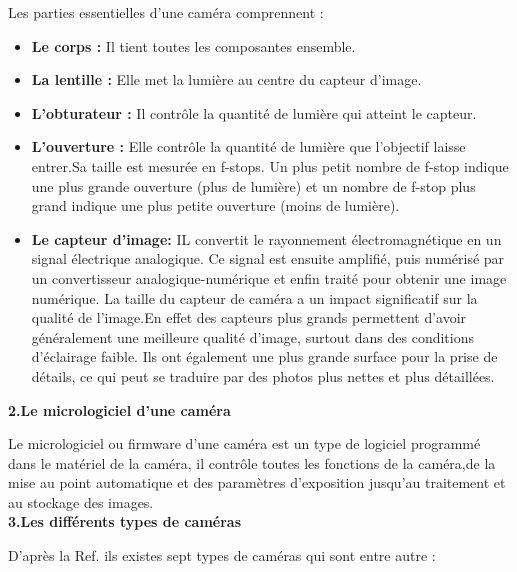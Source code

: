 \documentclass[12pt,a4paper]{report}
\begin{document}
Les parties essentielles d’une caméra comprennent : \\
\begin{itemize}
\item \textbf{Le corps :} Il tient toutes les composantes ensemble. \\
\item \textbf{La lentille :} Elle met la lumière au centre du capteur d’image. \\
\item \textbf{L’obturateur :} Il contrôle la quantité de lumière qui atteint le capteur.\\ 
\item \textbf{L’ouverture :} Elle contrôle la quantité de lumière que l’objectif laisse entrer.Sa taille est mesurée en f-stops. Un plus petit nombre de f-stop indique une plus grande ouverture (plus de lumière) et un nombre de f-stop plus grand indique une plus petite ouverture (moins de lumière).\\
\item \textbf{Le capteur d'image:} IL convertit le rayonnement électromagnétique en un signal électrique analogique. Ce signal est ensuite amplifié, puis numérisé par un convertisseur analogique-numérique et enfin traité pour obtenir une image numérique. La taille du capteur de caméra a un impact significatif sur la qualité de l’image.En effet des capteurs plus grands permettent d'avoir généralement une meilleure qualité d’image, surtout dans des conditions d’éclairage faible. Ils ont également une plus grande surface pour la prise de détails, ce qui peut se traduire par des photos plus nettes et plus détaillées.\\
\end{itemize}

\textbf{2.Le micrologiciel d'une caméra \\}

Le micrologiciel ou firmware d'une caméra est un type de logiciel programmé dans le matériel de la caméra, il contrôle toutes les fonctions de la caméra,de la mise au point automatique et des paramètres d’exposition jusqu’au traitement et au stockage des images.\\

\textbf{3.Les différents types de caméras \\}

D'après la Ref. \cite{noauthor_les_2015} ils existes sept types de caméras qui sont entre autre :\\
\end{document}
